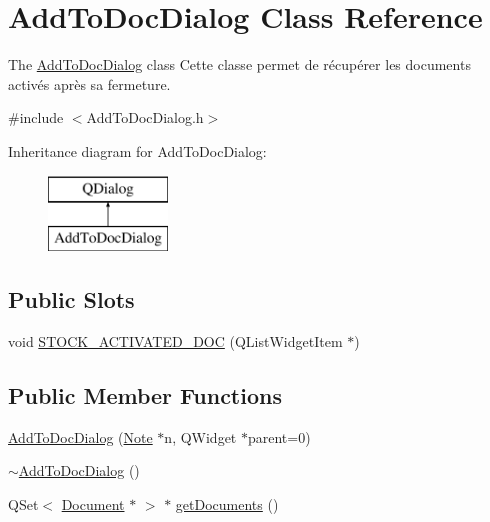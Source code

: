 \hypertarget{class_add_to_doc_dialog}{\section{Add\-To\-Doc\-Dialog Class Reference}
\label{class_add_to_doc_dialog}
}


The \hyperlink{class_add_to_doc_dialog}{Add\-To\-Doc\-Dialog} class Cette classe permet de récupérer les documents activés après sa fermeture.  




{\ttfamily \#include $<$Add\-To\-Doc\-Dialog.\-h$>$}

Inheritance diagram for Add\-To\-Doc\-Dialog\-:\begin{figure}[H]
\begin{center}
\leavevmode
\includegraphics[height=2.000000cm]{class_add_to_doc_dialog}
\end{center}
\end{figure}
\subsection*{Public Slots}
\begin{DoxyCompactItemize}
\item 
void \hyperlink{class_add_to_doc_dialog_a411708339415c29f8aa2bbb1f5ba4289}{S\-T\-O\-C\-K\-\_\-\-A\-C\-T\-I\-V\-A\-T\-E\-D\-\_\-\-D\-O\-C} (Q\-List\-Widget\-Item $\ast$)
\end{DoxyCompactItemize}
\subsection*{Public Member Functions}
\begin{DoxyCompactItemize}
\item 
\hyperlink{class_add_to_doc_dialog_a1ff31f5119731c6e6ae3e55b17774f8f}{Add\-To\-Doc\-Dialog} (\hyperlink{class_note}{Note} $\ast$n, Q\-Widget $\ast$parent=0)
\item 
\hyperlink{class_add_to_doc_dialog_a3b17b0adb562a892ecd5d13f563b879d}{$\sim$\-Add\-To\-Doc\-Dialog} ()
\item 
Q\-Set$<$ \hyperlink{class_document}{Document} $\ast$ $>$ $\ast$ \hyperlink{class_add_to_doc_dialog_af580a5df2d9fc1b8840132806b00d189}{get\-Documents} ()
\end{DoxyCompactItemize}



